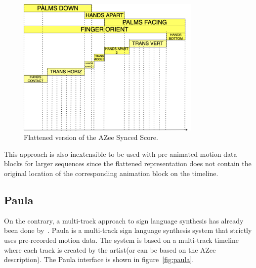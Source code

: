 \documentclass[../../main.tex]{subfiles}
\begin{document}
\begin{figure}[h]
    \centering
    \includegraphics[width=0.8\textwidth]{chapters/multi_track/images/azee_flattened_score.png}
    \caption{Flattened version of the AZee Synced Score.}
    \label{fig:azee_flattened_score}
\end{figure}

This approach is also inextensible to be used with pre-animated motion data blocks for larger sequences since the flattened representation does not contain the original location of the corresponding animation block on the timeline. 

\subsection{Paula}
\label{ch:multi_track:related_work:paula}

On the contrary, a multi-track approach to sign language synthesis has already been done by~\cite{filhol2017synthesizing}. Paula is a multi-track sign language synthesis system that strictly uses pre-recorded motion data. The system is based on a multi-track timeline where each track is created by the artist(or can be based on the AZee description). The Paula interface is shown in figure~\ref{fig:paula}.
\end{document}
